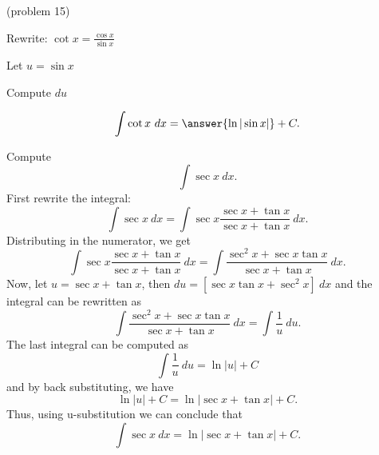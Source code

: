 \documentclass[handout]{ximera}
\begin{document}
\begin{problem}(problem 15)
\begin{hint}
Rewrite: $\cot x = \frac{\cos x}{\sin x}$
\end{hint}
\begin{hint}
Let $u = \sin x$
\end{hint}
\begin{hint}
Compute $du$
\end{hint}
\[\int \cot x \ dx = \answer{\ln|\sin x|} +C.\]
\end{problem}



\begin{example}[example 16] Compute 
\[\int \sec x \ dx.\]
First rewrite the integral:
\[\int \sec x \ dx =\int \sec x\frac{\sec x+\tan x}{\sec x+\tan x} \ dx.\]
Distributing in the numerator, we get
\[\int \sec x\frac{\sec x + \tan x}{\sec x +\tan x} \ dx = \int \frac{\sec^2 x +\sec x\tan x}{\sec x +\tan x} \ dx.\]
Now, let $u = \sec x + \tan x$, then $du = [\sec x\tan x + \sec^2 x] \ dx$ and the integral can be rewritten as
\[ \int \frac{\sec^2 x+\sec x\tan x}{\sec x+\tan x} \ dx = \int \frac{1}{u} \ du.\]
The last integral can be computed as
\[\int \frac{1}{u} \ du = \ln|u| + C\]
and by back substituting, we have 
\[\ln|u| + C = \ln|\sec x + \tan x| + C.\]
Thus, using u-substitution we can conclude that
\[\int \sec x \ dx =  \ln|\sec x + \tan x| + C.\]
\end{example}



\begin{center}
\begin{foldable}
\end{foldable}
\end{center}
\end{document}
